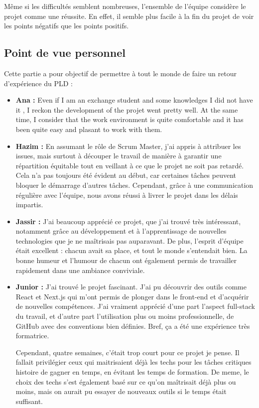 \documentclass[a4paper]{article}
\begin{document}
Même si les difficultés semblent nombreuses, l'ensemble de l'équipe considère le projet comme une réussite. En effet, il semble plus facile à la fin du projet de voir les points négatifs que les points positifs.

\subsection{Point de vue personnel}
Cette partie a pour objectif de permettre à tout le monde de faire un retour d'expérience du PLD :
\begin{itemize}
    \item \textbf{Ana : }Even if I am an exchange student and some knowledges I did not have it , I reckon the development of the projet went pretty well. At the same time, I consider that the work environment is quite comfortable and it has been quite easy and plasant to work with them.
    \item \textbf{Hazim : } En assumant le rôle de Scrum Master, j’ai appris à attribuer les issues, mais surtout à découper le travail de manière à garantir une répartition équitable tout en veillant à ce que le projet ne soit pas retardé. Cela n’a pas toujours été évident au début, car certaines tâches peuvent bloquer le démarrage d’autres tâches. Cependant, grâce à une communication régulière avec l’équipe, nous avons réussi à livrer le projet dans les délais impartis.
    \item \textbf{Jassir : }J’ai beaucoup apprécié ce projet, que j’ai trouvé très intéressant, notamment grâce au développement et à l’apprentissage de nouvelles technologies que je ne maîtrisais pas auparavant. De plus, l’esprit d’équipe était excellent : chacun avait sa place, et tout le monde s’entendait bien. La bonne humeur et l’humour de chacun ont également permis de travailler rapidement dans une ambiance conviviale.
    \item \textbf{Junior : }J'ai trouvé le projet fascinant. J'ai pu découvrir des  outils comme React et Next.js qui m’ont permis de plonger dans le front-end et d’acquérir de nouvelles compétences. J’ai vraiment apprécié  d'une part l’aspect full-stack du travail, et d'autre part l'utilisation plus ou moins professionnelle, de GitHub avec des conventions bien définies. Bref, ça a été une expérience très formatrice.

    Cependant, quatre semaines, c’était trop court pour ce projet je pense. Il fallait privilégier ceux qui maitrisaient déjà les techs pour les tâches critiques histoire de gagner en temps, en évitant les temps de formation. De meme, le choix des techs s'est également basé sur ce qu'on maîtrisait déjà plus ou moins, mais on aurait pu essayer de nouveaux outils si le temps était suffisant. 
    

\end{itemize}
\end{document}
